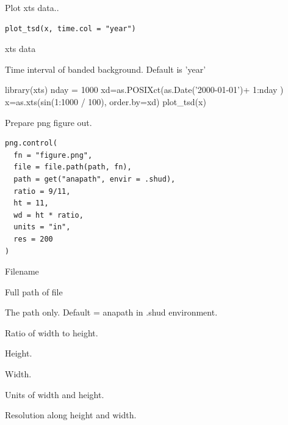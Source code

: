 \documentclass[a4paper]{book}
\begin{document}
%
\begin{Description}\relax
Plot xts data..
\end{Description}
%
\begin{Usage}
\begin{verbatim}
plot_tsd(x, time.col = "year")
\end{verbatim}
\end{Usage}
%
\begin{Arguments}
\begin{ldescription}
\item[\code{x}] xts data

\item[\code{time.col}] Time interval of banded background. Default is 'year'
\end{ldescription}
\end{Arguments}
%
\begin{Examples}
\begin{ExampleCode}
library(xts)
nday = 1000
xd=as.POSIXct(as.Date('2000-01-01')+ 1:nday )
x=as.xts(sin(1:1000 / 100), order.by=xd)
plot_tsd(x)
\end{ExampleCode}
\end{Examples}
%
\begin{Description}\relax
Prepare png figure out.
\end{Description}
%
\begin{Usage}
\begin{verbatim}
png.control(
  fn = "figure.png",
  file = file.path(path, fn),
  path = get("anapath", envir = .shud),
  ratio = 9/11,
  ht = 11,
  wd = ht * ratio,
  units = "in",
  res = 200
)
\end{verbatim}
\end{Usage}
%
\begin{Arguments}
\begin{ldescription}
\item[\code{fn}] Filename

\item[\code{file}] Full path of file

\item[\code{path}] The path only. Default = anapath in .shud environment.

\item[\code{ratio}] Ratio of width to height.

\item[\code{ht}] Height.

\item[\code{wd}] Width.

\item[\code{units}] Units of width and height.

\item[\code{res}] Resolution along height and width.
\end{ldescription}
\end{Arguments}
\end{document}
